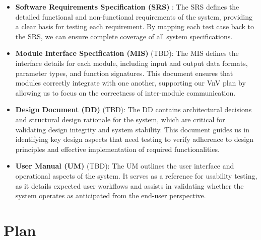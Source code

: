 \documentclass[12pt, titlepage]{article}
\begin{document}
\begin{itemize}
    \item \textbf{Software Requirements Specification (SRS)} \citep{SRS}: The SRS defines the detailed functional and non-functional requirements of the system, providing a clear basis for testing each requirement. By mapping each test case back to the SRS, we can ensure complete coverage of all system specifications. 

    \item \textbf{Module Interface Specification (MIS)} (TBD): The MIS defines the interface details for each module, including input and output data formats, parameter types, and function signatures. This document ensures that modules correctly integrate with one another, supporting our VnV plan by allowing us to focus on the correctness of inter-module communication.

    \item \textbf{Design Document (DD)} (TBD): The DD contains architectural decisions and structural design rationale for the system, which are critical for validating design integrity and system stability. This document guides us in identifying key design aspects that need testing to verify adherence to design principles and effective implementation of required functionalities.

    \item \textbf{User Manual (UM)} (TBD): The UM outlines the user interface and operational aspects of the system. It serves as a reference for usability testing, as it details expected user workflows and assists in validating whether the system operates as anticipated from the end-user perspective.
\end{itemize}





\section{Plan}
\end{document}
